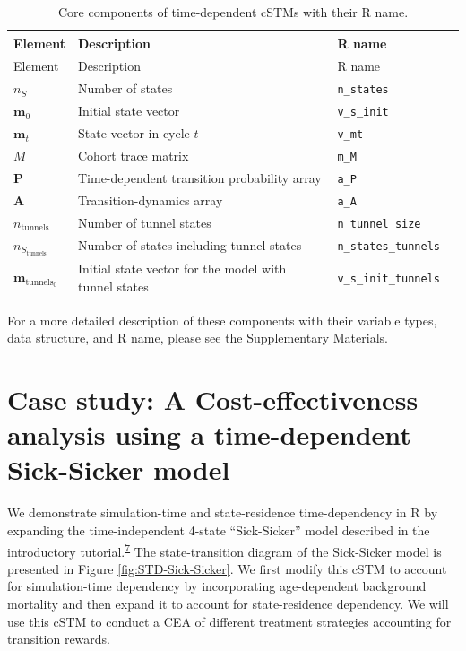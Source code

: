 \documentclass[
]{article}
\begin{document}
\begin{longtable}[]{@{}
  >{\raggedright\arraybackslash}p{}
  >{\raggedright\arraybackslash}p{}
  >{\centering\arraybackslash}p{}
  >{\raggedright\arraybackslash}p{}@{}}
\caption{\label{tab:Timedep-cSTM-components-table} Core components of time-dependent cSTMs with their R name.}\tabularnewline
\toprule
Element & Description & R name & \\
\midrule
\endfirsthead
\toprule
Element & Description & R name & \\
\midrule
\endhead
\(n_S\) & Number of states & \texttt{n\_states} & \\
\(\mathbf{m}_0\) & Initial state vector & \texttt{v\_s\_init} & \\
\(\mathbf{m}_t\) & State vector in cycle \(t\) & \texttt{v\_mt} & \\
\(M\) & Cohort trace matrix & \texttt{m\_M} & \\
\(\mathbf{P}\) & Time-dependent transition probability array & \texttt{a\_P} & \\
\(\mathbf{A}\) & Transition-dynamics array & \texttt{a\_A} & \\
\(n_{\text{tunnels}}\) & Number of tunnel states & \texttt{n\_tunnel\ size} & \\
\(n_{S_{\text{tunnels}}}\) & Number of states including tunnel states & \texttt{n\_states\_tunnels} & \\
\(\mathbf{m}_{\text{tunnels}_0}\) & Initial state vector for the model with tunnel states & \texttt{v\_s\_init\_tunnels} & \\
\bottomrule
\end{longtable}

For a more detailed description of these components with their variable types, data structure, and R name, please see the Supplementary Materials.

\hypertarget{case-study-a-cost-effectiveness-analysis-using-a-time-dependent-sick-sicker-model}{%
\section{Case study: A Cost-effectiveness analysis using a time-dependent Sick-Sicker model}\label{case-study-a-cost-effectiveness-analysis-using-a-time-dependent-sick-sicker-model}}

We demonstrate simulation-time and state-residence time-dependency in R by expanding the time-independent 4-state ``Sick-Sicker'' model described in the introductory tutorial.\textsuperscript{\protect\hyperlink{ref-Alarid-Escudero2021a}{7}} The state-transition diagram of the Sick-Sicker model is presented in Figure \ref{fig:STD-Sick-Sicker}. We first modify this cSTM to account for simulation-time dependency by incorporating age-dependent background mortality and then expand it to account for state-residence dependency. We will use this cSTM to conduct a CEA of different treatment strategies accounting for transition rewards.
\end{document}

